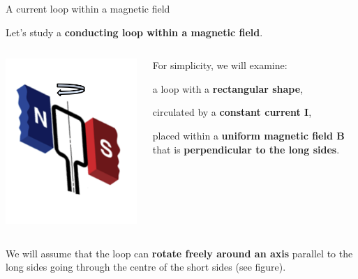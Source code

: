 %
%
%

\begin{frame}{A current loop within a magnetic field}

Let's study a {\bf conducting loop within a magnetic field}.\\
\vspace{0.3cm}
\begin{columns}
  \begin{column}{0.30\textwidth}
    \includegraphics[width=0.99\textwidth]{./images/schematics/current_loop_in_magnetic_field.png}\\
  \end{column}
  \begin{column}{0.70\textwidth}
     {\small
      For simplicity, we will examine:
      \begin{itemize}
      {\small
        \item a loop with a {\bf rectangular shape},
        \item circulated by a {\bf constant current I},
        \item placed within a {\bf uniform magnetic field B} that is {\bf perpendicular to the long sides}.
      }
      \end{itemize}
     }
  \end{column}
\end{columns}
We will assume that the loop can {\bf rotate freely around an axis} parallel
to the long sides going through the centre of the short sides (see figure).\\

\end{frame}

